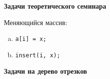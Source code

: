 \documentclass[12pt,a4paper,oneside]{article}
\renewcommand{\t}{\texttt}
\begin{document}
\newenvironment{MyList}{
  \begin{enumerate}
  \setlength{\parskip}{0pt}
  \setlength{\itemsep}{5pt}
}{
  \setlength{\parskip}{0pt}
  \end{enumerate}
}

\newenvironment{InnerMyList}{
  \begin{enumerate}[a)]
  \setlength{\parskip}{0pt}
  \setlength{\itemsep}{2pt}
}{
  \setlength{\parskip}{0pt}
  \end{enumerate}
}

\newcommand{\q}[1]{\langle #1 \rangle}
\newcommand\NO[1]{\t{\##1}}
\def\O{\mathcal{O}}
\def\EPS{\varepsilon}
\def\SO{\Rightarrow}
\def\EQ{\Leftrightarrow}
\def\t{\texttt}
\def\XOR{\text{ {\raisebox{-2pt}{\ensuremath{\Hat{}}}} }}
\def\LINE{\vspace*{-1em}\noindent \underline{\hbox to 1\textwidth{{ } \hfil{ } \hfil{ } }}}
\newcommand{\sfrac}[2]{{\scriptstyle\frac{#1}{#2}}}  %
\newcommand{\mfrac}[2]{{\textstyle\frac{#1}{#2}}}    %

\vspace*{0em}
\centerline{\Large\bf Задачи теоретического семинара}

\bigskip

Меняющийся массив: 
\begin{InnerMyList}
  \item \t{a[i] = x;}
  \item \t{insert(i, x);}
\end{InnerMyList}

{\bf Задачи на дерево отрезков}
\end{document}
